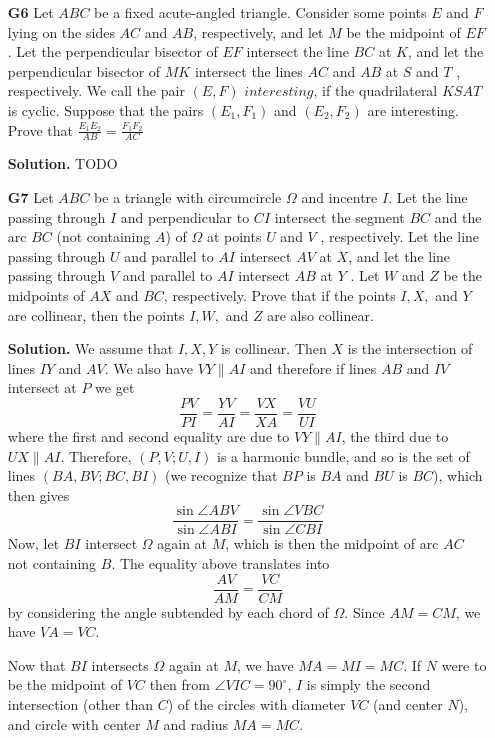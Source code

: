 \documentclass[11pt,a4paper]{article}
\begin{document}
\begin{enumerate}
	\item[\textbf{G6}] Let $ABC$ be a fixed acute-angled triangle. Consider some points $E$ and $F$ lying on the sides $AC$ and $AB$, respectively, and let $M$ be the midpoint of $EF$ . Let the perpendicular bisector of $EF$ intersect the line $BC$ at $K$, and let the perpendicular bisector of $MK$ intersect the lines $AC$ and $AB$ at $S$ and $T$ , respectively. We call the pair $(E, F )$ $\textit{interesting}$, if the quadrilateral $KSAT$ is cyclic.
	Suppose that the pairs $(E_1 , F_1 )$ and $(E_2 , F_2 )$ are interesting. Prove that $\displaystyle\frac{E_1 E_2}{AB}=\frac{F_1 F_2}{AC}$
	
	\textbf{Solution.} TODO
	
	\item[\textbf{G7}] Let $ABC$ be a triangle with circumcircle $\Omega$ and incentre $I$. Let the line passing through $I$ and perpendicular to $CI$ intersect the segment $BC$ and the arc $BC$ (not containing $A$) of $\Omega$ at points $U$ and $V$ , respectively. Let the line passing through $U$ and parallel to $AI$ intersect $AV$ at $X$, and let the line passing through $V$ and parallel to $AI$ intersect $AB$ at $Y$ . Let $W$ and $Z$ be the midpoints of $AX$ and $BC$, respectively. Prove that if the points $I, X,$ and $Y$ are collinear, then the points $I, W ,$ and $Z$ are also collinear.
	
	\textbf{Solution.} We assume that $I, X, Y$ is collinear. Then $X$ is the intersection of lines $IY$ and $AV$. We also have $VY\parallel AI$ and therefore if lines $AB$ and $IV$ intersect at $P$ we get 
	\[
	\frac{PV}{PI} = \frac{YV}{AI} = \frac{VX}{XA} = \frac{VU}{UI}
	\]
	where the first and second equality are due to $VY\parallel AI$, the third due to $UX \parallel AI$. Therefore, $(P, V; U, I)$ is a harmonic bundle, and so is the set of lines $(BA, BV; BC, BI)$ (we recognize that $BP$ is $BA$ and $BU$ is $BC$), which then gives 
	\[
	\frac{\sin\angle ABV}{\sin\angle ABI} = \frac{\sin\angle VBC}{\sin\angle CBI}
	\]
	Now, let $BI$ intersect $\Omega$ again at $M$, which is then the midpoint of arc $AC$ not containing $B$. The equality above translates into 
	\[
	\frac{AV}{AM}=\frac{VC}{CM}
	\]
	by considering the angle subtended by each chord of $\Omega$. Since $AM=CM$, we have $VA=VC$. 
	
	Now that $BI$ intersects $\Omega$ again at $M$, we have $MA=MI=MC$. If $N$ were to be the midpoint of $VC$ then from $\angle VIC=90^{\circ}$, $I$ is simply the second intersection (other than $C$) of the circles with diameter $VC$ (and center $N$), and circle with center $M$ and radius $MA=MC$. 
	

\end{enumerate}
\end{document}
